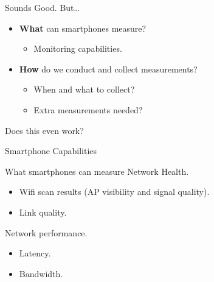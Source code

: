 \begin{frame}{Sounds Good. But\ldots}
  \Large
  \begin{itemize}
    \item \textbf{What} can smartphones measure?
      \begin{itemize}
        \item Monitoring capabilities.
      \end{itemize}
    \item \textbf{How} do we conduct and collect measurements?
      \begin{itemize}
        \item When and what to collect?
        \item Extra measurements needed?
      \end{itemize}
  \end{itemize}
  \begin{center}
    \Huge Does this even work?
  \end{center}
\end{frame}

\begin{frame}{Smartphone Capabilities}
  \begin{block}{What smartphones can measure}
    Network Health.
    \begin{itemize}
      \item Wifi scan results (AP visibility and signal quality).
      \item Link quality.
    \end{itemize}
    Network performance.
    \begin{itemize}
      \item Latency.
      \item Bandwidth.
    \end{itemize}
  \end{block}
\end{frame}


